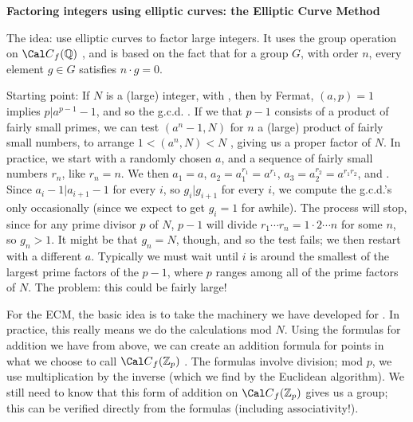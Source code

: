 
\ssk


\msk

{\bf Factoring integers using elliptic curves: the Elliptic Curve Method}

\msk

The idea: use elliptic curves  to factor large integers. It uses 
the group operation on ${\Cal C}_f({\Bbb Q})$ , and is based 
on the fact that for a  group $G$, with
order $n$, every element $g\in G$ satisfies $n\cdot g=0$. 

\ssk

Starting point:  
If $N$ is a (large) integer, with , then
by Fermat, $(a,p)=1$ implies $p|a^{p-1}-1$, 
and so the g.c.d. .
If we  that
$p-1$ consists of a product of fairly small primes, we can
test $(a^{n}-1,N)$ for $n$ a (large) product of 
fairly small numbers, to arrange
$1<(a^n,N)<N$ , giving
us a proper factor of $N$. In practice, we start with 
a randomly chosen $a$, and a sequence of fairly
small numbers $r_n$, like $r_n=n$. We then  $a_1=a$, $a_2=a_1^{r_1}=a^{r_1}$, 
$a_3=a_2^{r_2}=a^{r_1r_2}$, and
. Since
$a_i-1|a_{i+1}-1$ for every $i$,
so $g_i|g_{i+1}$ for every $i$, we compute 
the g.c.d.'s only occasionally (since we expect to 
get $g_i=1$ for awhile). The process will stop, 
since for any prime divisor $p$ of $N$,
$p-1$ will divide $r_1\cdots r_n=1\cdot 2\cdots n$ for 
some $n$, so $g_n>1$. It might be that $g_n=N$, 
though, and so the test 
fails; we then restart with a different $a$. Typically 
we must wait until $i$ is around the smallest 
of the largest prime factors of  the $p-1$, where $p$ ranges 
among all of the prime factors of $N$. The problem: this 
could be fairly large!

\msk

For the ECM, the basic idea is to take the machinery we 
have developed for . In practice, this really means we do 
the calculations mod $N$. Using the formulas for 
addition we have from above, we can 
create an addition 
formula for points in what we choose to call 
${\Cal C}_f({\Bbb Z}_p)$ . The formulas involve 
division; mod $p$, we use  multiplication 
by the inverse (which we
 find by the Euclidean algorithm). We still need 
to know that this form of addition on 
${\Cal C}_f({\Bbb Z}_p)$ gives us a group; this
 can 
be verified directly  
from the formulas (including associativity!). 

